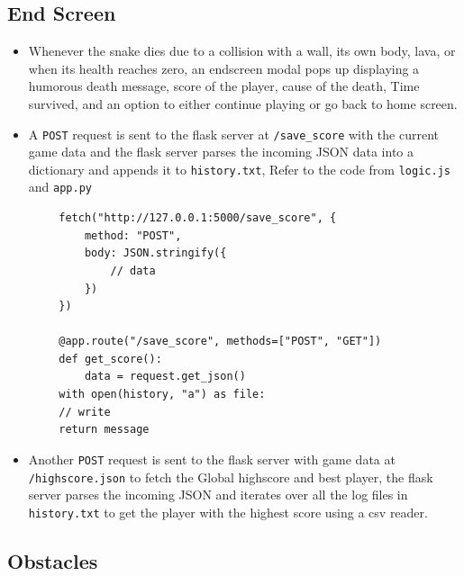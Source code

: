 \documentclass{article}
\begin{document}
    \subsection{End Screen}
    \label{sec:EndScreen}
    \begin{itemize}
        \item Whenever the snake dies due to a collision with a wall, its own body, lava, or when its health reaches zero, an endscreen modal pops up displaying a humorous death message, score of the player, cause of the death, Time survived, and an option to either continue playing or go back to home screen.
        \item A \texttt{POST}\cite{fetch_api} request is sent to the flask server at \texttt{/save\_score} with the current game data and the flask server parses the incoming JSON data into a dictionary and appends it to \texttt{history.txt}, Refer to the code from \texttt{logic.js} and \texttt{app.py}
    \end{itemize}
    \begin{verbatim}
        fetch("http://127.0.0.1:5000/save_score", {
            method: "POST",
            body: JSON.stringify({
                // data
            })
        })

        @app.route("/save_score", methods=["POST", "GET"])
        def get_score():
            data = request.get_json()
        with open(history, "a") as file:
        // write
        return message
    \end{verbatim}
    \begin{itemize}
        \item Another \texttt{POST} request is sent to the flask server with game data at \texttt{/highscore.json} to fetch the Global highscore and best player, the flask server parses the incoming JSON and iterates over all the log files in \texttt{history.txt} to get the player with the highest score using a csv reader.
    \end{itemize}
    \subsection{Obstacles}
\end{document}

